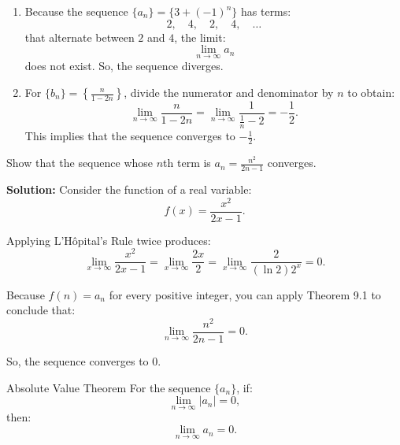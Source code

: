 \documentclass[12pt]{article}
\theoremstyle{beautifulthm}
\begin{document}
\begin{tcolorbox}[colback=examplebg, colframe=red!75!black, title=\textbf{EXAMPLE 3: Determining Convergence or Divergence}, fonttitle=\bfseries, sharp corners]

\begin{enumerate}
    \item Because the sequence $\{a_n\} = \{3 + (-1)^n\}$ has terms:
    \[
    2, \quad 4, \quad 2, \quad 4, \quad \dots
    \]
    that alternate between $2$ and $4$, the limit:
    \[
    \lim_{n \to \infty} a_n
    \]
    does not exist. So, the sequence diverges.

    \item For $\{b_n\} = \left\{\frac{n}{1 - 2n}\right\}$, divide the numerator and denominator by $n$ to obtain:
    \[
    \lim_{n \to \infty} \frac{n}{1 - 2n} = \lim_{n \to \infty} \frac{1}{\frac{1}{n} - 2} = -\frac{1}{2}.
    \]
    This implies that the sequence converges to $-\frac{1}{2}$.
\end{enumerate}

\end{tcolorbox}

\begin{tcolorbox}[colback=examplebg, colframe=red!75!black, title=\textbf{EXAMPLE 4: Using L'Hôpital's Rule to Determine Convergence}, fonttitle=\bfseries, sharp corners]

Show that the sequence whose $n$th term is $a_n = \frac{n^2}{2n - 1}$ converges.

\tcblower
\textbf{Solution:} 
Consider the function of a real variable:
\[
f(x) = \frac{x^2}{2x - 1}.
\]

Applying L'Hôpital's Rule twice produces:
\[
\lim_{x \to \infty} \frac{x^2}{2x - 1} = \lim_{x \to \infty} \frac{2x}{2} = \lim_{x \to \infty} \frac{2}{(\ln 2) 2^x} = 0.
\]

Because $f(n) = a_n$ for every positive integer, you can apply Theorem 9.1 to conclude that:
\[
\lim_{n \to \infty} \frac{n^2}{2n - 1} = 0.
\]

So, the sequence converges to $0$.
\end{tcolorbox}

\newpage

\begin{mytheorem}{Absolute Value Theorem}{}
    For the sequence $\{a_n\}$, if:
\[
\lim_{n \to \infty} \lvert a_n \rvert = 0,
\]
then:
\[
\lim_{n \to \infty} a_n = 0.
\]
\end{mytheorem}
\end{document}

